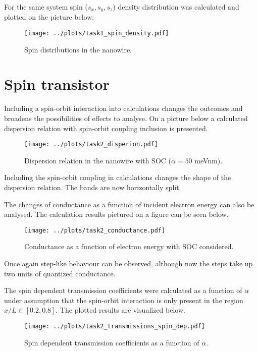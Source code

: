 \documentclass[12pt,a4]{article}
\begin{document}
For the same system spin ($s_x,s_y,s_z$) density distribution was calculated and plotted on the picture below:

\begin{figure}[H]
	\texttt{[image: ../plots/task1\_spin\_density.pdf]}
	\caption{Spin distributions in the nanowire.}
\end{figure}

\section*{Spin transistor}

Including a spin-orbit interaction into calculations changes the outcomes and broadens the possibilities of effects to analyse. On a picture below a calculated dispersion relation with spin-orbit coupling inclusion is presented.

\begin{figure}[H]
	\centering
	\texttt{[image: ../plots/task2\_disperion.pdf]}
	\caption{Dispersion relation in the nanowire with SOC ($\alpha=50$ meVnm).}
\end{figure}

Including the spin-orbit coupling in calculations changes the shape of the dispersion relation. The bands are now horizontally split. 

The changes of conductance as a function of incident electron energy can also be analysed. The calculation results pictured on a figure can be seen below.

\begin{figure}[H]
	\centering
	\texttt{[image: ../plots/task2\_conductance.pdf]}
	\caption{Conductance as a function of electron energy with SOC considered.}
\end{figure}

Once again step-like behaviour can be observed, although now the steps take up two units of quantized conductance.

The spin dependent transmission coefficients were calculated as a function of $\alpha$ under assumption that the spin-orbit interaction is only present in the region $x/L\in[0.2, 0.8]$. The plotted results are visualized below.

\begin{figure}[H]
	\centering
	\texttt{[image: ../plots/task2\_transmissions\_spin\_dep.pdf]}
	\caption{Spin dependent transmission coefficients as a function of $\alpha$.}
\end{figure}
\end{document}
